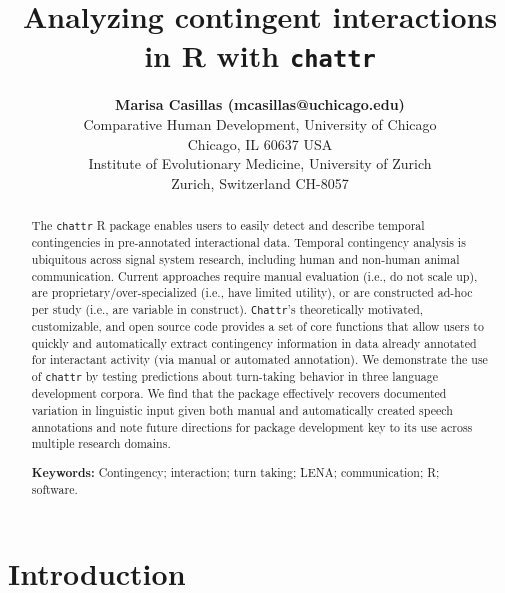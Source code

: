 \documentclass[10pt, letterpaper]{article}
\title{Analyzing contingent interactions in R with \texttt{chattr}}
\author{{\large \bf Marisa Casillas (mcasillas@uchicago.edu)} \\ Comparative Human Development, University of Chicago \\ Chicago, IL 60637 USA \AND {\large \bf Camila Scaff (camila.scaff@iem.uzh.ch)} \\ Institute of Evolutionary Medicine, University of Zurich \\ Zurich, Switzerland CH-8057}
\begin{document}
\maketitle

\begin{abstract}
The \texttt{chattr} R package enables users to easily detect and
describe temporal contingencies in pre-annotated interactional data.
Temporal contingency analysis is ubiquitous across signal system
research, including human and non-human animal communication. Current
approaches require manual evaluation (i.e., do not scale up), are
proprietary/over-specialized (i.e., have limited utility), or are
constructed ad-hoc per study (i.e., are variable in construct).
\texttt{Chattr}'s theoretically motivated, customizable, and open source
code provides a set of core functions that allow users to quickly and
automatically extract contingency information in data already annotated
for interactant activity (via manual or automated annotation). We
demonstrate the use of \texttt{chattr} by testing predictions about
turn-taking behavior in three language development corpora. We find that
the package effectively recovers documented variation in linguistic
input given both manual and automatically created speech annotations and
note future directions for package development key to its use across
multiple research domains.

\textbf{Keywords:}
Contingency; interaction; turn taking; LENA; communication; R; software.
\end{abstract}

\hypertarget{introduction}{%
\section{Introduction}\label{introduction}}
\end{document}

